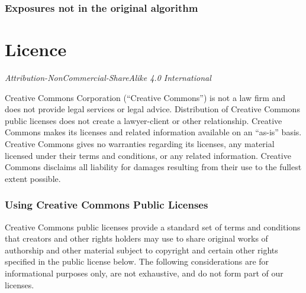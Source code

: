 \documentclass[]{book}
\begin{document}
\subsection{Exposures not in the original
algorithm}\label{exposures-not-in-the-original-algorithm}

\chapter{Licence}\label{licence}

\emph{Attribution-NonCommercial-ShareAlike 4.0 International}

Creative Commons Corporation (``Creative Commons'') is not a law firm
and does not provide legal services or legal advice. Distribution of
Creative Commons public licenses does not create a lawyer-client or
other relationship. Creative Commons makes its licenses and related
information available on an ``as-is'' basis. Creative Commons gives no
warranties regarding its licenses, any material licensed under their
terms and conditions, or any related information. Creative Commons
disclaims all liability for damages resulting from their use to the
fullest extent possible.

\subsection{Using Creative Commons Public
Licenses}\label{using-creative-commons-public-licenses}

Creative Commons public licenses provide a standard set of terms and
conditions that creators and other rights holders may use to share
original works of authorship and other material subject to copyright and
certain other rights specified in the public license below. The
following considerations are for informational purposes only, are not
exhaustive, and do not form part of our licenses.
\end{document}
